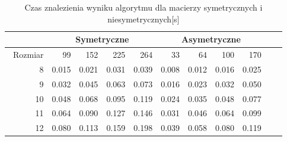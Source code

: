 \begin{table}
\centering
\begin{tabular}{|r|r|r|r|r|r|r|r|r|r|r|}
\hline
 & \multicolumn{4}{|c|}{Symetryczne} & \multicolumn{4}{|c|}{Asymetryczne} \\ \hline\
Rozmiar & 99 & 152 & 225 & 264 & 33 & 64 & 100 & 170 \\ \hline
8 & 0.015 & 0.021 & 0.031 & 0.039 & 0.008 & 0.012 & 0.016 & 0.025 \\
9 & 0.032 & 0.045 & 0.063 & 0.073 & 0.016 & 0.023 & 0.032 & 0.050 \\
10 & 0.048 & 0.068 & 0.095 & 0.119 & 0.024 & 0.035 & 0.048 & 0.077 \\
11 & 0.064 & 0.090 & 0.127 & 0.146 & 0.031 & 0.046 & 0.064 & 0.099 \\
12 & 0.080 & 0.113 & 0.159 & 0.198 & 0.039 & 0.058 & 0.080 & 0.119 \\ \hline
\end{tabular}
\caption{Czas znalezienia wyniku algorytmu dla macierzy symetrycznych i niesymetrycznych[s]}
\label{tab:time_AnEpoch}
\end{table}
